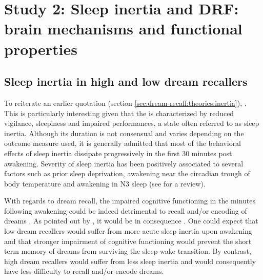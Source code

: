 \section{Study 2: Sleep inertia and DRF: brain mechanisms and functional properties}
\label{sec:problematic:inertia}

\subsection{Sleep inertia in high and low dream recallers}
\label{sec:problematic:inertia:drf}

To reiterate an earlier quotation (section \ref{sec:dream-recall:theories:inertia}),  \citep{conduit_poor_2004}. This is particularly interesting given that the  is characterized by reduced vigilance, sleepiness and impaired performances, a state often referred to as sleep inertia. Although its duration is not consensual and varies depending on the outcome measure used, it is generally admitted that most of the behavioral effects of sleep inertia dissipate progressively in the first 30 minutes post awakening. Severity of sleep inertia has been positively associated to several factors such as prior sleep deprivation, awakening near the circadian trough of body temperature and awakening in N3 sleep (see \citealp{tassi_sleep_2000} for a review).

With regards to dream recall, the impaired cognitive functioning in the minutes following awakening could be indeed detrimental to recall and/or encoding of dreams \citep{conduit_poor_2004}. As pointed out by \citet{schredl_factors_2003}, it would be in consequence . One could expect that low dream recallers would suffer from more acute sleep inertia upon awakening and that stronger impairment of cognitive functioning would prevent the short term memory of dreams from surviving the sleep-wake transition. By contrast, high dream recallers would suffer from less sleep inertia and would consequently have less difficulty to recall and/or encode dreams.


